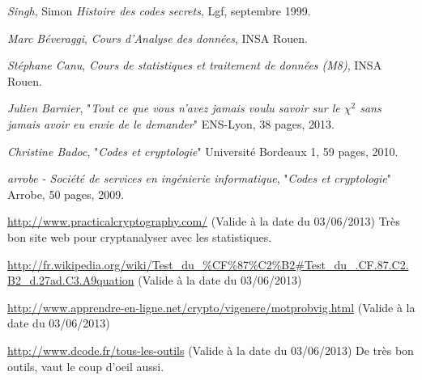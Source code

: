 \documentclass[a4paper, titlepage]{livret}
\begin{document}
\begin{thebibliography}{9}

		\emph{Singh}, Simon
		\textit{Histoire des codes secrets},
		Lgf, septembre 1999.

		\emph{Marc Béveraggi},
		\textit{Cours d'Analyse des données},
		INSA Rouen.
	
		\emph{Stéphane Canu},
		\textit{Cours de statistiques et traitement de données (M8)},
		INSA Rouen.

		\emph{Julien Barnier},
		"\textit{Tout ce que vous n'avez jamais voulu savoir sur le $\chi^{2}$ sans jamais avoir eu envie de le demander}"
		ENS-Lyon,
		38 pages, 2013.

		\emph{Christine Badoc},
		"\textit{Codes et cryptologie}"
		Université Bordeaux 1,
		59 pages, 2010.

		\emph{arrobe - Société de services en ingénierie informatique},
		"\textit{Codes et cryptologie}"
		Arrobe,
		50 pages, 2009.

		\url{http://www.practicalcryptography.com/}
		(Valide à la date du 03/06/2013)
		Très bon site web pour cryptanalyser avec les statistiques.

		\url{http://fr.wikipedia.org/wiki/Test_du_%CF%87%C2%B2#Test_du_.CF.87.C2.B2_d.27ad.C3.A9quation}
		(Valide à la date du 03/06/2013)

		\url{http://www.apprendre-en-ligne.net/crypto/vigenere/motprobvig.html}
		(Valide à la date du 03/06/2013)
	
		\url{http://www.dcode.fr/tous-les-outils}
		(Valide à la date du 03/06/2013)
		De très bon outils, vaut le coup d'oeil aussi.

\end{thebibliography}
\end{document}

